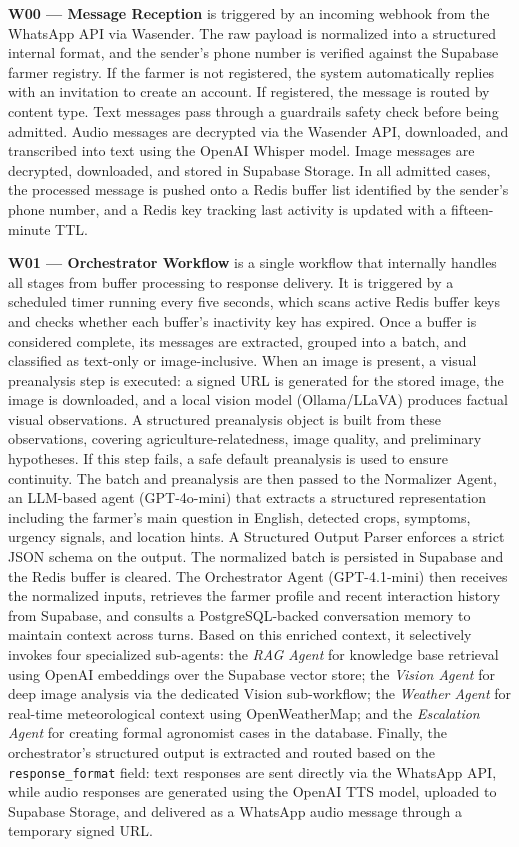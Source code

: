 \textbf{W00 — Message Reception} is triggered by an incoming webhook from the WhatsApp API via Wasender. The raw payload is normalized into a structured internal format, and the sender's phone number is verified against the Supabase farmer registry. If the farmer is not registered, the system automatically replies with an invitation to create an account. If registered, the message is routed by content type. Text messages pass through a guardrails safety check before being admitted. Audio messages are decrypted via the Wasender API, downloaded, and transcribed into text using the OpenAI Whisper model. Image messages are decrypted, downloaded, and stored in Supabase Storage. In all admitted cases, the processed message is pushed onto a Redis buffer list identified by the sender's phone number, and a Redis key tracking last activity is updated with a fifteen-minute TTL.

\textbf{W01 — Orchestrator Workflow} is a single workflow that internally handles all stages from buffer processing to response delivery. It is triggered by a scheduled timer running every five seconds, which scans active Redis buffer keys and checks whether each buffer's inactivity key has expired. Once a buffer is considered complete, its messages are extracted, grouped into a batch, and classified as text-only or image-inclusive. When an image is present, a visual preanalysis step is executed: a signed URL is generated for the stored image, the image is downloaded, and a local vision model (Ollama/LLaVA) produces factual visual observations. A structured preanalysis object is built from these observations, covering agriculture-relatedness, image quality, and preliminary hypotheses. If this step fails, a safe default preanalysis is used to ensure continuity. The batch and preanalysis are then passed to the Normalizer Agent, an LLM-based agent (GPT-4o-mini) that extracts a structured representation including the farmer's main question in English, detected crops, symptoms, urgency signals, and location hints. A Structured Output Parser enforces a strict JSON schema on the output. The normalized batch is persisted in Supabase and the Redis buffer is cleared. The Orchestrator Agent (GPT-4.1-mini) then receives the normalized inputs, retrieves the farmer profile and recent interaction history from Supabase, and consults a PostgreSQL-backed conversation memory to maintain context across turns. Based on this enriched context, it selectively invokes four specialized sub-agents: the \textit{RAG Agent} for knowledge base retrieval using OpenAI embeddings over the Supabase vector store; the \textit{Vision Agent} for deep image analysis via the dedicated Vision sub-workflow; the \textit{Weather Agent} for real-time meteorological context using OpenWeatherMap; and the \textit{Escalation Agent} for creating formal agronomist cases in the database. Finally, the orchestrator's structured output is extracted and routed based on the \texttt{response\_format} field: text responses are sent directly via the WhatsApp API, while audio responses are generated using the OpenAI TTS model, uploaded to Supabase Storage, and delivered as a WhatsApp audio message through a temporary signed URL.

